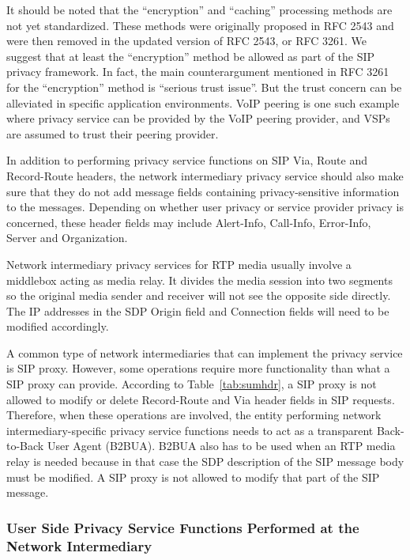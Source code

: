 \documentclass[letterpaper,notitlepage,times,12pt]{article}
\begin{document}
It should be noted that the ``encryption'' and ``caching'' processing methods are not yet standardized. These methods were originally proposed in RFC 2543 and were then removed in the updated version of RFC 2543, or RFC 3261. We suggest that at least the ``encryption'' method be allowed as part of the SIP privacy framework. In fact, the main counterargument mentioned in RFC 3261 for the ``encryption'' method is ``serious trust issue''. But the trust concern can be alleviated in specific application environments. VoIP peering is one such example where privacy service can be provided by the VoIP peering provider, and VSPs are assumed to trust their peering provider.

In addition to performing privacy service functions on SIP {\sf Via}, {\sf Route} and {\sf Record-Route} headers, the network intermediary privacy service should also make sure that they do not add message fields containing privacy-sensitive information to the messages. Depending on whether user privacy or service provider privacy is concerned, these header fields may include {\sf Alert-Info}, {\sf Call-Info}, {\sf Error-Info}, {\sf Server} and {\sf Organization}.

Network intermediary privacy services for RTP media usually involve a middlebox acting as media relay. It divides the media session into two segments so the original media sender and receiver will not see the opposite side directly. The IP addresses in the SDP {\sf Origin} field and {\sf Connection} fields will need to be modified accordingly.

A common type of network intermediaries that can implement the privacy service is SIP proxy. However, some operations require more functionality than what a SIP proxy can provide. According to Table~\ref{tab:sumhdr}, a SIP proxy is not allowed to modify or delete {\sf Record-Route} and {\sf Via} header fields in SIP requests. Therefore, when these operations are involved, the entity performing network intermediary-specific privacy service functions needs to act as a transparent Back-to-Back User Agent (B2BUA). B2BUA also has to be used when an RTP media relay is needed because in that case the SDP description of the SIP message body must be modified. A SIP proxy is not allowed to modify that part of the SIP message.

\subsubsection{User Side Privacy Service Functions Performed at the Network Intermediary} \label{sec:upsatnps}
\end{document}

